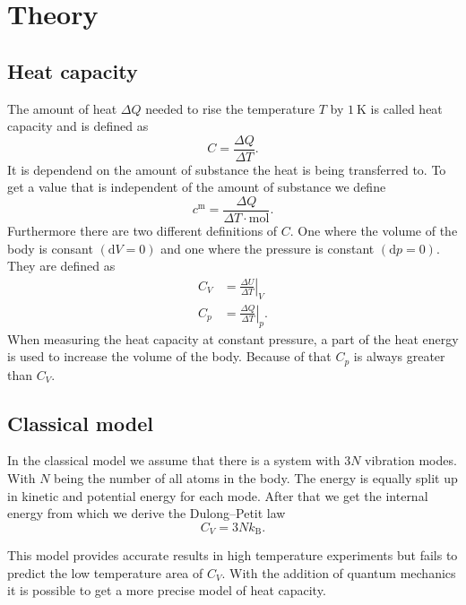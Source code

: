 \section{Theory}
\label{sec:Theory}

\subsection{Heat capacity}
\label{ssec:theory1}

The amount of heat $\Delta Q$ needed to rise the temperature $T$ by $\SI{1}{\kelvin}$ is called heat capacity and is defined as
\begin{equation}
    C = \frac{\Delta Q}{\Delta T}.
    \label{eq:heat}
\end{equation}
It is dependend on the amount of substance the heat is being transferred to.
To get a value that is independent of the amount of substance we define
\begin{equation}
    c^{\text{m}} = \frac{\Delta Q}{\Delta T \cdot \si{\mol}}.
    \label{eq:heat_mole}
\end{equation}
Furthermore there are two different definitions of $C$.
One where the volume of the body is consant $(\mathrm{d} V = 0)$ and one where the pressure is constant $(\mathrm{d} p = 0)$.
They are defined as 
\begin{align}
    C_V &= \left. \frac{\Delta U}{\Delta T} \right\vert_{V}\\ 
    C_p &= \left. \frac{\Delta Q}{\Delta T} \right\vert_{p}.
\end{align}
When measuring the heat capacity at constant pressure, a part of the heat energy is used to increase the volume of the body.
Because of that $C_p$ is always greater than $C_V$.

\subsection{Classical model}
\label{ssec:theory2}

In the classical model we assume that there is a system with $3 N$ vibration modes.
With $N$ being the number of all atoms in the body.
The energy is equally split up in kinetic and potential energy for each mode.
After that we get the internal energy from which we derive the Dulong–Petit law
\begin{equation}
    C_V = 3 N k_\text{B}.
    \label{eq:dulong}
\end{equation}

This model provides accurate results in high temperature experiments but fails to predict the low temperature area of $C_V$.
With the addition of quantum mechanics it is possible to get a more precise model of heat capacity.

